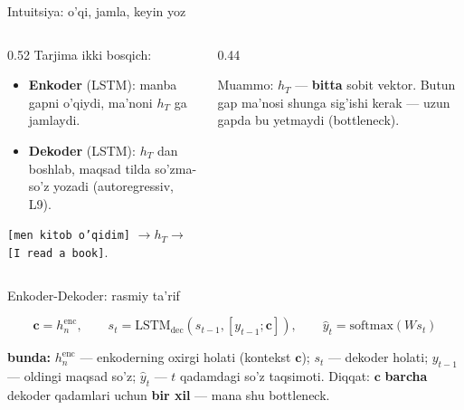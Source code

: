 \documentclass[aspectratio=169,11pt]{beamer}
\newcommand{\bunda}[1]{{\small\textbf{bunda:}\; #1}}
\begin{document}
\begin{frame}{Intuitsiya: o'qi, jamla, keyin yoz}
  \begin{columns}[T]
    \begin{column}{0.52\textwidth}
      \small
      Tarjima ikki bosqich:
      \begin{itemize}\setlength\itemsep{1pt}
        \item \textbf{Enkoder} (LSTM): manba gapni o'qiydi, ma'noni $h_T$ ga jamlaydi.
        \item \textbf{Dekoder} (LSTM): $h_T$ dan boshlab, maqsad tilda so'zma-so'z
              yozadi (autoregressiv, L9).
      \end{itemize}
      \vspace{4pt}
      \texttt{[men kitob o'qidim]} $\to h_T \to$ \texttt{[I read a book]}.
    \end{column}
    \begin{column}{0.44\textwidth}
      \begin{tcolorbox}[okbox,top=2pt,bottom=2pt]
        \footnotesize
        Muammo: $h_T$ --- \textbf{bitta} sobit vektor. Butun gap ma'nosi shunga
        sig'ishi kerak --- uzun gapda bu yetmaydi (bottleneck).
      \end{tcolorbox}
    \end{column}
  \end{columns}
\end{frame}

\begin{frame}{Enkoder-Dekoder: rasmiy ta'rif}
  \begin{tcolorbox}[defbox,title=Ta'rif: Seq2Seq (attention'siz)]
    \vspace{-0.4em}
    $$ \mathbf{c} = h_n^{\text{enc}}, \qquad
       s_t = \mathrm{LSTM}_{\text{dec}}(s_{t-1}, [y_{t-1}; \mathbf{c}]), \qquad
       \hat{y}_t = \mathrm{softmax}(W s_t) $$
  \end{tcolorbox}
  \vspace{2pt}
  \bunda{$h_n^{\text{enc}}$ --- enkoderning oxirgi holati (kontekst $\mathbf{c}$);
  $s_t$ --- dekoder holati; $y_{t-1}$ --- oldingi maqsad so'z; $\hat{y}_t$ ---
  $t$ qadamdagi so'z taqsimoti.}
  \vspace{4pt}
  \footnotesize Diqqat: $\mathbf{c}$ \textbf{barcha} dekoder qadamlari uchun
  \textbf{bir xil} --- mana shu bottleneck.
\end{frame}
\end{document}
